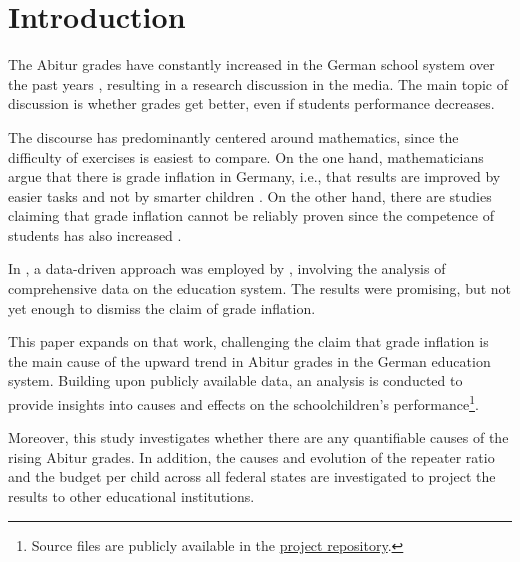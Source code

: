 \section{Introduction} \label{sec:Introduction}
The Abitur grades have constantly increased in the German school system over the past years \cite{kultusminister_konferenz_abiturnoten_nodate}, resulting in a research discussion in the media. The main topic of discussion is whether grades get better, even if students performance decreases.

The discourse has predominantly centered around mathematics, since the difficulty of exercises is easiest to compare. On the one hand, mathematicians argue that there is grade inflation in Germany, i.e., that results are improved by easier tasks and not by smarter children \cite{kuhnel_modellierungskompetenz_2015, jahnke_hamburger_2014,lemmermeyer_zentralabitur_nodate}. On the other hand, there are studies claiming that grade inflation cannot be reliably proven since the competence of students has also increased \cite{schleithoff_noteninflation_2015}.

In \citeyear{grozinger_gibt_2015}, a data-driven approach was employed by \citeauthor{grozinger_gibt_2015}, involving the analysis of comprehensive data on the education system. The results were promising, but not yet enough to dismiss the claim of grade inflation.

This paper expands on that work, challenging the claim that grade inflation is the main cause of the upward trend in Abitur grades in the German education system. Building upon publicly available data, an analysis is conducted to provide insights into causes and effects on the schoolchildren's performance\footnote{Source files are publicly available in the \href{https://github.com/KarylReyne/DataLiteracyWS23}{project repository}.}.

Moreover, this study investigates whether there are any quantifiable causes of the rising Abitur grades. In addition, the causes and evolution of the repeater ratio and the budget per child across all federal states are investigated to project the results to other educational institutions.

